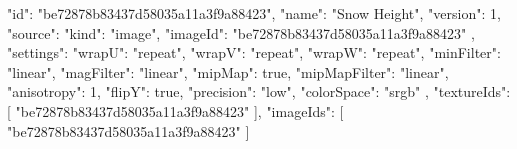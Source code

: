 {
  "id": "be72878b83437d58035a11a3f9a88423",
  "name": "Snow Height",
  "version": 1,
  "source": {
    "kind": "image",
    "imageId": "be72878b83437d58035a11a3f9a88423"
  },
  "settings": {
    "wrapU": "repeat",
    "wrapV": "repeat",
    "wrapW": "repeat",
    "minFilter": "linear",
    "magFilter": "linear",
    "mipMap": true,
    "mipMapFilter": "linear",
    "anisotropy": 1,
    "flipY": true,
    "precision": "low",
    "colorSpace": "srgb"
  },
  "textureIds": [
    "be72878b83437d58035a11a3f9a88423"
  ],
  "imageIds": [
    "be72878b83437d58035a11a3f9a88423"
  ]
}
